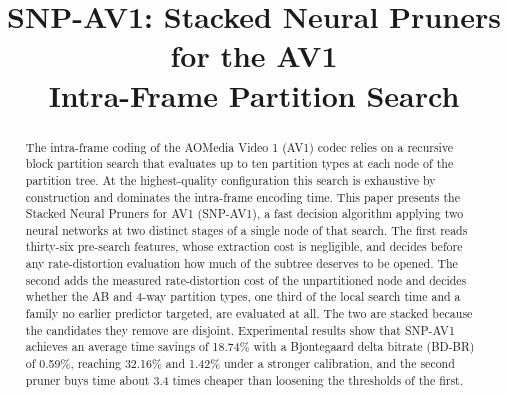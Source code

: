 \documentclass[conference]{IEEEtran}
\begin{document}
\title{SNP-AV1: Stacked Neural Pruners for the AV1\\ Intra-Frame Partition Search}

\author{
\and
{}
\and
{}
\and
{}
}

\maketitle

\begin{abstract}
The intra-frame coding of the AOMedia Video 1 (AV1) codec relies on a recursive
block partition search that evaluates up to ten partition types at each node of
the partition tree. At the highest-quality configuration this search is exhaustive by
construction and dominates the intra-frame encoding time. This paper presents the
Stacked Neural Pruners for AV1 (SNP-AV1), a fast decision algorithm applying two
neural networks at two distinct stages of a single node of that search. The first
reads thirty-six pre-search features, whose extraction cost is negligible, and
decides before any rate-distortion evaluation how much of the subtree deserves to
be opened. The second adds the measured rate-distortion cost of the unpartitioned
node and decides whether the AB and 4-way partition types, one third of the local
search time and a family no earlier predictor targeted, are evaluated at all. The two are stacked because the candidates they remove are disjoint.
Experimental results show that SNP-AV1 achieves an average time savings of
18.74\% with a Bjontegaard delta bitrate (BD-BR) of 0.59\%, reaching 32.16\% and
1.42\% under a stronger calibration, and the second pruner buys time about 3.4
times cheaper than loosening the thresholds of the first.
\end{abstract}
\end{document}
